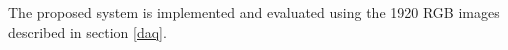 The proposed system is implemented and evaluated using the 1920 RGB images described in section \ref{daq}.